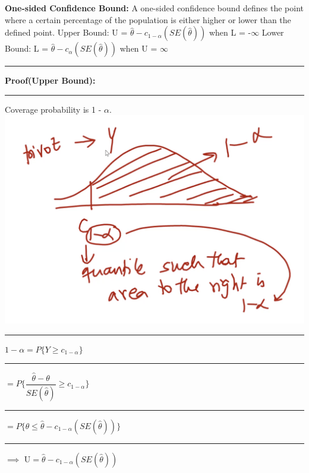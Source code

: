 \documentclass[]{article}
\begin{document}
\newline
\newline
\newline
\Large\textbf{One-sided Confidence Bound:}
\newline A one-sided confidence bound defines the point where a certain percentage of the population is either higher or lower than the defined point.
\newline
\newline Upper Bound: U = $\hat\theta - c_{1- \alpha }(SE(\hat\theta))$ when  L = -$\infty$
\newline
\newline Lower Bound: L = $\hat\theta - c_{\alpha }(SE(\hat\theta))$ when  U = $\infty$
\newline
\newline\Large\rule{3.0cm}{0pt} \textbf{Proof(Upper Bound):}
\newline\Large\rule{3.0cm}{0pt} Coverage probability is 1 - $\alpha$.
\newline
\includegraphics[scale=0.47]{one_sided_ci}
\newline\Large\rule{3.0cm}{0pt}  $ 1- \alpha =  P \{ Y \ge  c_{1- \alpha}  \}$
\newline
\newline\Large\rule{4.3cm}{0pt}  $=  P \{ \dfrac{\hat{\theta} - \theta}{ SE(\hat{\theta})}  \ge  c_{1- \alpha}   \}$
\newline
\newline\Large\rule{4.3cm}{0pt}  $=  P \{ \theta \le \hat{\theta} -  c_{1- \alpha }(SE(\hat\theta))  \}$
\newline
\newline\Large\rule{2.8cm}{0pt} $\implies$  U$=  \hat{\theta} -  c_{1- \alpha }(SE(\hat\theta))$
\end{document}
